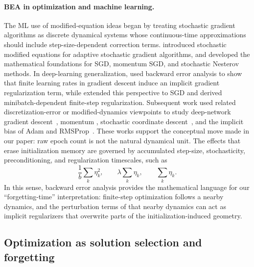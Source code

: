 \documentclass{article}
\begin{document}
\paragraph{BEA in optimization and machine learning.}
The ML use of modified-equation ideas began by treating stochastic gradient algorithms as discrete dynamical systems whose continuous-time approximations should include step-size-dependent correction terms.  \citep{li2017stochastic} introduced stochastic modified equations for adaptive stochastic gradient algorithms, and \citep{li2019stochastic} developed the mathematical foundations for SGD, momentum SGD, and stochastic Nesterov methods.  In deep-learning generalization, \citep{barrett2021implicit} used backward error analysis to show that finite learning rates in gradient descent induce an implicit gradient regularization term, while \citep{smith2021origin,beneventano2023trajectories} extended this perspective to SGD and derived minibatch-dependent finite-step regularization.  Subsequent work used related discretization-error or modified-dynamics viewpoints to study deep-network gradient descent~\citep{miyagawa2022toward}, momentum \citep{rosca2023continuous,ghosh2023implicit,cattaneo2025modified}, stochastic coordinate descent~\citep{digiovacchino2024backward}, and the implicit bias of Adam and RMSProp~\citep{cattaneo2024implicit,cattaneo2026memory,cattaneo2026effect}.  These works support the conceptual move made in our paper: raw epoch count is not the natural dynamical unit.  The effects that erase initialization memory are governed by accumulated step-size, stochasticity, preconditioning, and regularization timescales, such as
\[
    \frac{1}{b}\sum_k \eta_k^2,
    \qquad
    \lambda\sum_k \eta_k,
    \qquad
    \sum_k \eta_k .
\]
In this sense, backward error analysis provides the mathematical language for our ``forgetting-time'' interpretation: finite-step optimization follows a nearby dynamics, and the perturbation terms of that nearby dynamics can act as implicit regularizers that overwrite parts of the initialization-induced geometry.

\subsection{Optimization as solution selection and forgetting}
\label{app:optimization-selection}
\end{document}
